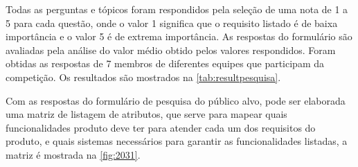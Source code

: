 Todas as perguntas e tópicos foram respondidos pela seleção de uma nota de 1 a 5 para cada questão, onde o valor 1 significa que o requisito listado é de baixa importância e
o valor 5 é de extrema importância. As respostas do formulário são avaliadas pela análise do valor médio obtido pelos valores respondidos. Foram obtidas as respostas de 7
membros de diferentes equipes que participam da competição. Os resultados são mostrados na \autoref{tab:resultpesquisa}.

\begin{table}[!hb]
    \caption{Resultado pesquisa de mercado}
    \label{tab:resultpesquisa}
    \centering
\end{table}

Com as respostas do formulário de pesquisa do público alvo, pode ser elaborada uma matriz de listagem de atributos, que serve para mapear quais funcionalidades produto deve ter para atender cada um dos requisitos
do produto, e quais sistemas necessários para garantir as funcionalidades listadas, a matriz é mostrada na \autoref{fig:2031}.

